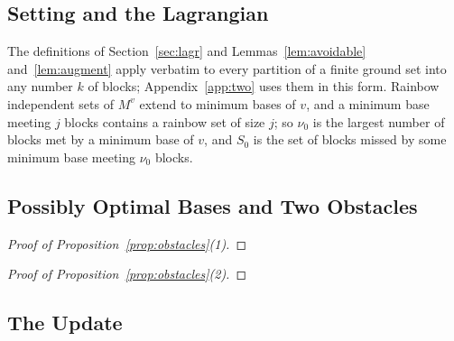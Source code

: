\subsection{Setting and the Lagrangian}
\label{app:lagr}

The definitions of Section~\ref{sec:lagr} and Lemmas~\ref{lem:avoidable}
and~\ref{lem:augment} apply verbatim to every partition of a finite ground set
into any number $k$ of blocks; Appendix~\ref{app:two} uses them in this form.
Rainbow independent sets of $M^{v}$ extend to minimum bases of $v$, and a minimum
base meeting $j$ blocks contains a rainbow set of size $j$; so $\nu_0$ is the
largest number of blocks met by a minimum base of $v$, and $S_0$ is the set of
blocks missed by some minimum base meeting $\nu_0$ blocks.




\subsection{Possibly Optimal Bases and Two Obstacles}
\label{app:pos}




\begin{proof}[Proof of Proposition~\ref{prop:obstacles}(1)]
\end{proof}

\begin{proof}[Proof of Proposition~\ref{prop:obstacles}(2)]
\end{proof}

\subsection{The Update}
\label{app:update}

